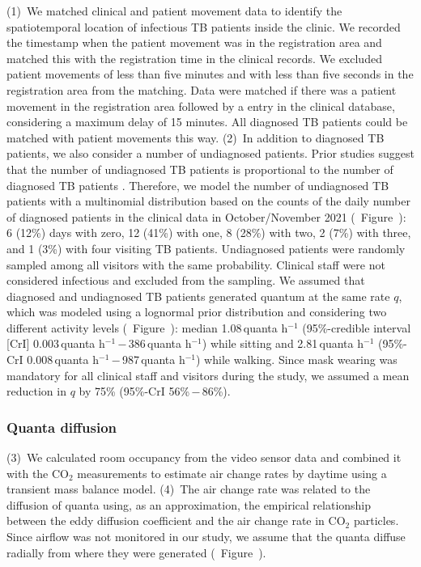 \documentclass[fleqn,11pt]{wlscirep}
\begin{document}
(1)~We matched clinical and patient movement data to identify the spatiotemporal location of infectious TB patients inside the clinic. We recorded the timestamp when the patient movement was in the registration area and matched this with the registration time in the clinical records. We excluded patient movements of less than five minutes and with less than five seconds in the registration area from the matching. Data were matched if there was a patient movement in the registration area followed by a entry in the clinical database, considering a maximum delay of 15 minutes. All diagnosed TB patients could be matched with patient movements this way. (2)~In addition to diagnosed TB patients, we also consider a number of undiagnosed patients. Prior studies suggest that the number of undiagnosed TB patients is proportional to the number of diagnosed TB patients \cite{Berhanu2023CID}. Therefore, we model the number of undiagnosed TB patients with a multinomial distribution based on the counts of the daily number of diagnosed patients in the clinical data in October/November 2021 (\supp~Figure~): 6 (12\%) days with zero, 12 (41\%) with one, 8 (28\%) with two, 2 (7\%) with three, and 1 (3\%) with four visiting TB patients. Undiagnosed patients were randomly sampled among all visitors with the same probability. Clinical staff were not considered infectious and excluded from the sampling. We assumed that diagnosed and undiagnosed TB patients generated quantum at the same rate $q$, which was modeled using a lognormal prior distribution and considering two different activity levels (\supp~Figure~): median 1.08\,quanta h$^{-1}$ (95\%-credible interval [CrI] 0.003\,quanta h$^{-1}$\,$-$\,386\,quanta h$^{-1}$) while sitting and 2.81\,quanta h$^{-1}$ (95\%-CrI 0.008\,quanta h$^{-1}$\,$-$\,987\,quanta h$^{-1}$) while walking\cite{Mikszewski2021GF,Buonanno2020EI,Banholzer2024PGPH}. Since mask wearing was mandatory for all clinical staff and visitors during the study, we assumed a mean reduction in $q$ by 75\% (95\%-CrI 56\%\,$-$\,86\%)\cite{Dharmadhikari2012AJRCCM,McCreesh2021BMJGlobalHealth}.

\subsubsection*{Quanta diffusion}

(3)~We calculated room occupancy from the video sensor data and combined it with the CO$_2$ measurements to estimate air change rates by daytime using a transient mass balance model\cite{Batterman2017IJERPH}. (4)~The air change rate was related to the diffusion of quanta using, as an approximation, the empirical relationship between the eddy diffusion coefficient and the air change rate in CO$_2$ particles\cite{Cheng2011EnvSciTech,Foat2020BE}. Since airflow was not monitored in our study, we assume that the quanta diffuse radially from where they were generated (\supp~Figure~). 
\end{document}
